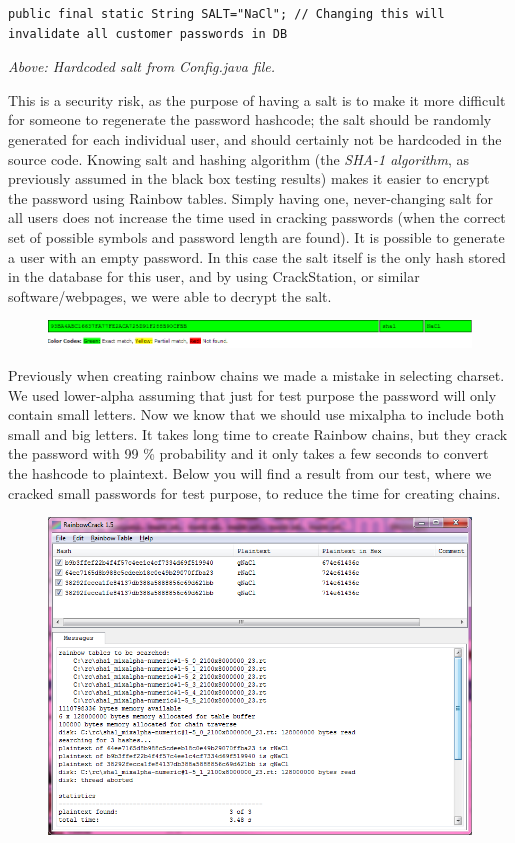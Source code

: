 \begin{lstlisting}
public final static String SALT="NaCl"; // Changing this will invalidate all customer passwords in DB
\end{lstlisting}
{\em Above: Hardcoded salt from Config.java file.}

This is a security risk, as the purpose of having a salt is to make it more difficult for someone to regenerate the password hashcode; the salt should be randomly generated for each individual user, and should certainly not be hardcoded in the source code. Knowing salt and hashing algorithm (the {\em SHA-1 algorithm}, as previously assumed in the black box testing results) makes it easier to encrypt the password using Rainbow tables. Simply having one, never-changing salt for all users does not increase the time used in cracking passwords (when the correct set of possible symbols and password length are found). It is possible to generate a user with an empty password. In this case the salt itself is the only hash stored in the database for this user, and by using CrackStation, or similar software/webpages, we were able to decrypt the salt.

\begin{figure}[!ht]
  \includegraphics[scale=0.5]{pics/tre.png}
\end{figure}

Previously when creating rainbow chains we made a mistake in selecting charset. We used lower-alpha assuming that just for test purpose the password will only contain small letters. Now we know that we should use mixalpha to include both small and big letters. It takes long time to create Rainbow chains, but they crack the password with 99 \% probability and it only takes a few seconds to convert the hashcode to plaintext. Below you will find a result from our test, where we cracked small passwords for test purpose, to reduce the time for creating chains.

\begin{figure}[!ht]
  \includegraphics[scale=0.8]{pics/Untitled.png}
\end{figure}


